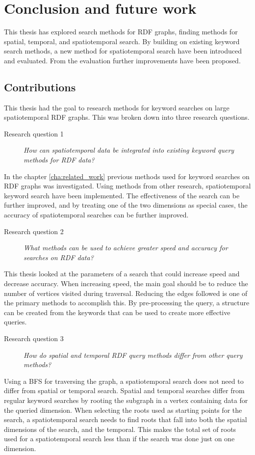 \chapter{Conclusion and future work}
\label{cha:Conclusion}
This thesis has explored search methods for RDF graphs, finding methods for spatial, temporal, and spatiotemporal search. By building on existing keyword search methods, a new method for spatiotemporal search have been introduced and evaluated. From the evaluation further improvements have been proposed.

\section{Contributions}
\label{sec:Contributions}
This thesis had the goal to research methods for keyword searches on large spatiotemporal RDF graphs. This was broken down into three research questions.

\begin{description}
    \item[Research question 1] {\em How can spatiotemporal data be integrated into existing keyword query methods for RDF data?}
\end{description}
In the chapter \ref{cha:related_work} previous methods used for keyword searches on RDF graphs was investigated. Using methods from other research, spatiotemporal keyword search have been implemented. The effectiveness of the search can be further improved, and by treating one of the two dimensions as special cases, the accuracy of spatiotemporal searches can be further improved.

\begin{description}
    \item[Research question 2] {\em What methods can be used to achieve greater speed and accuracy for searches on RDF data?}
\end{description}
This thesis looked at the parameters of a search that could increase speed and decrease accuracy. When increasing speed, the main goal should be to reduce the number of vertices visited during traversal. Reducing the edges followed is one of the primary methods to accomplish this. By pre-processing the query, a structure can be created from the keywords that can be used to create more effective queries.

\begin{description}
    \item[Research question 3] {\em How do spatial and temporal RDF query methods differ from other query methods?}
\end{description}
Using a BFS for traversing the graph, a spatiotemporal search does not need to differ from spatial or temporal search. Spatial and temporal searches differ from regular keyword searches by rooting the subgraph in a vertex containing data for the queried dimension. When selecting the roots used as starting points for the search, a spatiotemporal search needs to find roots that fall into both the spatial dimensions of the search, and the temporal. This makes the total set of roots used for a spatiotemporal search less than if the search was done just on one dimension.

